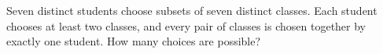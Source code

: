 Seven distinct students choose subsets of seven distinct classes. Each student chooses at least two classes, and every pair of classes is chosen together by exactly one student. How many choices are possible?
